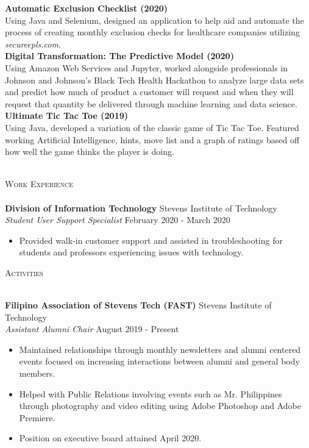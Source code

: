 \documentclass[10pt]{article}
\newcommand{\lineunder} {
    \vspace*{-8pt} \\
    \hspace*{-18pt} \hrulefill \\
}
\newcommand{\header} [1] {
    {\hspace*{-18pt}\vspace*{6pt} \textsc{#1}}
    \vspace*{-6pt} \lineunder
}
\begin{document}
{\textbf{Automatic Exclusion Checklist (2020)}} \hfill 
\\
Using Java and Selenium, designed an application to help aid and automate the process of creating monthly exclusion checks for healthcare companies utilizing \textit{secureepls.com}.\\
\vspace*{2mm}
{\textbf{Digital Transformation: The Predictive Model (2020)}} \hfill 
\\
Using Amazon Web Services and Jupyter, worked alongside professionals in Johnson and Johnson's Black Tech Health Hackathon to analyze large data sets and predict how much of product a customer will request and when they will request that quantity be delivered through machine learning and data science.\\
\vspace*{2mm}
{\textbf{Ultimate Tic Tac Toe (2019)}} \hfill 
\\
Using Java, developed a variation of the classic game of Tic Tac Toe. Featured working Artificial Intelligence, hints, move list and a graph of ratings based off how well the game thinks the player is doing.\\
\vspace*{2mm}
\ 
\header{Work Experience}
\vspace{1mm}
\textbf{Division of Information Technology} \hfill Stevens Institute of Technology\\
\textit{Student User Support Specialist} \hfill February 2020 - March 2020\\
\vspace{-1mm}
\begin{itemize} \itemsep 1pt
	\item Provided walk-in customer support and assisted in troubleshooting for students and professors experiencing issues with technology.
\end{itemize}

\header{Activities}
\vspace{1mm}

\textbf{Filipino Association of Stevens Tech (FAST)} \hfill Stevens Institute of Technology\\
\textit{Assistant Alumni Chair} \hfill August 2019 - Present\\
\vspace{-1mm}
\begin{itemize} \itemsep 1pt
	\item Maintained relationships through monthly newsletters and alumni centered events focused on increasing interactions between alumni and general body members.
	\item Helped with Public Relations involving events such as Mr. Philippines through photography and video editing using Adobe Photoshop and Adobe Premiere.
	\item Position on executive board attained April 2020.
\end{itemize}
\end{document}
